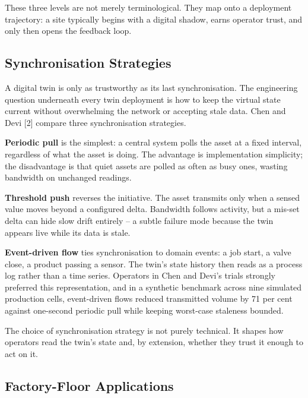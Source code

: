 \documentclass[
  12pt,
  a4paper,
]{article}
\begin{document}
These three levels are not merely terminological. They map onto a
deployment trajectory: a site typically begins with a digital shadow,
earns operator trust, and only then opens the feedback loop.

\hypertarget{synchronisation-strategies}{%
\subsection{Synchronisation
Strategies}\label{synchronisation-strategies}}

A digital twin is only as trustworthy as its last synchronisation. The
engineering question underneath every twin deployment is how to keep the
virtual state current without overwhelming the network or accepting
stale data. Chen and Devi {[}2{]} compare three synchronisation
strategies.

\textbf{Periodic pull} is the simplest: a central system polls the asset
at a fixed interval, regardless of what the asset is doing. The
advantage is implementation simplicity; the disadvantage is that quiet
assets are polled as often as busy ones, wasting bandwidth on unchanged
readings.

\textbf{Threshold push} reverses the initiative. The asset transmits
only when a sensed value moves beyond a configured delta. Bandwidth
follows activity, but a mis-set delta can hide slow drift entirely -- a
subtle failure mode because the twin appears live while its data is
stale.

\textbf{Event-driven flow} ties synchronisation to domain events: a job
start, a valve close, a product passing a sensor. The twin's state
history then reads as a process log rather than a time series. Operators
in Chen and Devi's trials strongly preferred this representation, and in
a synthetic benchmark across nine simulated production cells,
event-driven flows reduced transmitted volume by 71 per cent against
one-second periodic pull while keeping worst-case staleness bounded.

The choice of synchronisation strategy is not purely technical. It
shapes how operators read the twin's state and, by extension, whether
they trust it enough to act on it.

\hypertarget{factory-floor-applications}{%
\subsection{Factory-Floor
Applications}\label{factory-floor-applications}}
\end{document}
